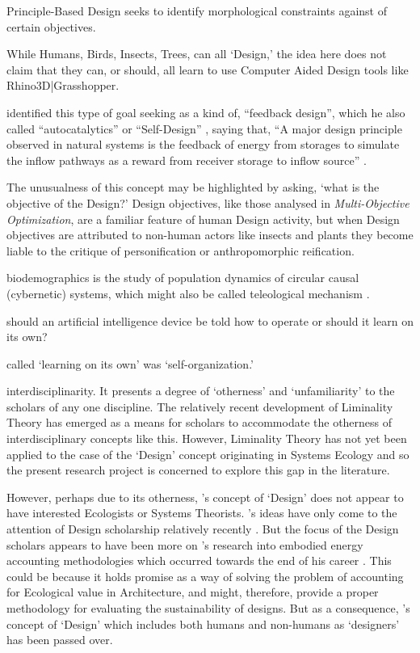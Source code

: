 \documentclass[a4paper,12pt]{article}
\begin{document}
Principle-Based Design seeks to identify morphological constraints against of certain objectives.


While Humans, Birds, Insects, Trees, can all `Design,' the idea here does not claim that they can, or should, all learn to use Computer Aided Design tools like  Rhino3D\texttrademark|Grasshopper\texttrademark. 


\citeauthor{odum_ecological_1994} identified this type of goal seeking as a kind of, ``feedback design'', which he also called ``autocatalytics'' or ``Self-Design'' \citep[pp.~6,451]{odum_systems_1983}, saying that, ``A major design principle observed in natural systems is the feedback of energy from storages to simulate the inflow pathways as a reward from receiver storage to inflow source'' \citep[p.~6]{odum_systems_1983}.


The unusualness of this concept may be highlighted by asking, `what is the objective of the Design?' Design objectives, like those analysed in \textit{Multi-Objective Optimization}, are a familiar feature of human Design activity, but when Design objectives are attributed to non-human actors like insects and plants they become liable to the critique of personification or anthropomorphic reification.

biodemographics is the study of population dynamics of circular causal (cybernetic) systems, which might also be called teleological mechanism \citep[pp.~221-222]{hutchinson_circular_1948}.

should an artificial intelligence device be told how to operate or should it learn on its own? 

called `learning on its own' was  `self-organization.'




interdisciplinarity. It presents a degree of `otherness' and `unfamiliarity' to the scholars of any one discipline. The relatively recent development of Liminality Theory \citep{rendell_working_2013, gardner_transformation_2017} has emerged as a means for scholars to accommodate the otherness of interdisciplinary concepts like this. However, Liminality Theory has not yet been applied to the case of the `Design' concept originating in Systems Ecology and so the present research project is concerned to explore this gap in the literature. 

 However, perhaps due to its otherness, \citeauthor{odum_emergy_1991}'s concept of `Design' does not appear to have interested Ecologists or Systems Theorists. \citeauthor{odum_emergy_1991}'s ideas have only come to the attention of Design scholarship relatively recently \citep{}. But the focus of the Design scholars appears to have been more on \citeauthor{odum_environmental_1996}'s research into embodied energy accounting methodologies which occurred towards the end of his career \citep{odum_environmental_1996}. This could be because it holds promise as a way of solving the problem of accounting for Ecological value in Architecture, and might, therefore, provide a proper methodology for evaluating the sustainability of designs. But as a consequence, \citeauthor{odum_emergy_1991}'s concept of `Design' which includes both humans and non-humans as `designers' has been passed over.
\end{document}
